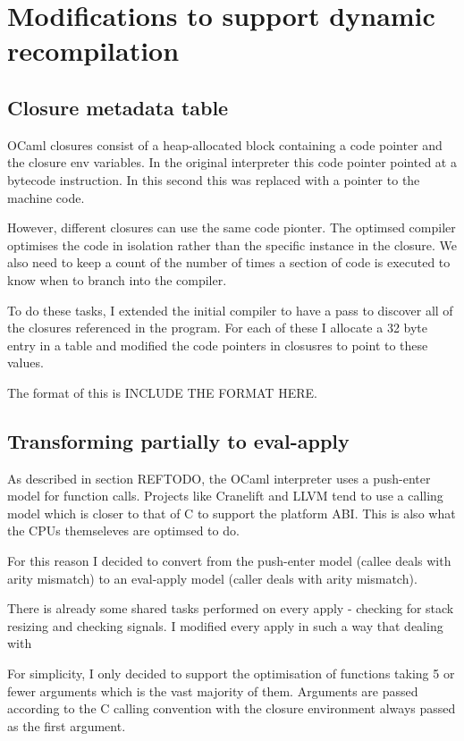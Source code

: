 \section{Modifications to support dynamic recompilation}

\subsection{Closure metadata table}

OCaml closures consist of a heap-allocated block containing a code pointer and the closure env
variables. In the original interpreter this code pointer pointed at a bytecode instruction. In this
second this was replaced with a pointer to the machine code.

However, different closures can use the same code pionter. The optimsed compiler optimises the code
in isolation rather than the specific instance in the closure. We also need to keep a count of the
number of times a section of code is executed to know when to branch into the compiler.

To do these tasks, I extended the initial compiler to have a pass to discover all of the closures
referenced in the program. For each of these I allocate a 32 byte entry in a table and modified the
code pointers in closusres to point to these values.

The format of this is INCLUDE THE FORMAT HERE.

\subsection{Transforming partially to eval-apply}

As described in section REFTODO, the OCaml interpreter uses a push-enter model for function calls.
Projects like Cranelift and LLVM tend to use a calling model which is closer to that of C to
support the platform ABI. This is also what the CPUs themseleves are optimsed to do.

For this reason I decided to convert from the push-enter model (callee deals with arity mismatch)
to an eval-apply model (caller deals with arity mismatch).

There is already some shared tasks performed on every apply - checking for stack resizing and
checking signals. I modified every apply in such a way that dealing with

For simplicity, I only decided to support the optimisation of functions taking 5 or fewer arguments
which is the vast majority of them. Arguments are passed according to the C calling convention with
the closure environment always passed as the first argument.


